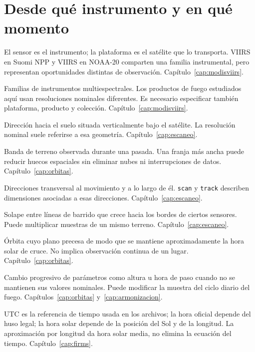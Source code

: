 \section{Desde qué instrumento y en qué momento}
\begin{description}[style=nextline,leftmargin=1.2em]
\item[Sensor y plataforma.] El sensor es el instrumento; la plataforma es el satélite
que lo transporta. VIIRS en Suomi NPP y VIIRS en NOAA-20 comparten una familia instrumental,
pero representan oportunidades distintas de observación. Capítulo~\ref{cap:modisviirs}.
\item[MODIS y VIIRS.] Familias de instrumentos multiespectrales. Los productos de fuego
estudiados aquí usan resoluciones nominales diferentes. Es necesario especificar también
plataforma, producto y colección. Capítulo~\ref{cap:modisviirs}.
\item[Nadir.] Dirección hacia el suelo situada verticalmente bajo el satélite. La
resolución nominal suele referirse a esa geometría. Capítulo~\ref{cap:escaneo}.
\item[Franja o swath.] Banda de terreno observada durante una pasada. Una franja más
ancha puede reducir huecos espaciales sin eliminar nubes ni interrupciones de datos.
Capítulo~\ref{cap:orbitas}.
\item[Barrido y traza.] Direcciones transversal al movimiento y a lo largo de él.
\texttt{scan} y \texttt{track} describen dimensiones asociadas a esas direcciones.
Capítulo~\ref{cap:escaneo}.
\item[Efecto pajarita.] Solape entre líneas de barrido que crece hacia los bordes de
ciertos sensores. Puede multiplicar muestras de un mismo terreno. Capítulo~\ref{cap:escaneo}.
\item[Órbita heliosíncrona.] Órbita cuyo plano precesa de modo que se mantiene
aproximadamente la hora solar de cruce. No implica observación continua de un lugar.
Capítulo~\ref{cap:orbitas}.
\item[Deriva orbital.] Cambio progresivo de parámetros como altura u hora de paso cuando
no se mantienen sus valores nominales. Puede modificar la muestra del ciclo diario del
fuego. Capítulos~\ref{cap:orbitas} y~\ref{cap:armonizacion}.
\item[UTC, hora oficial y hora solar.] UTC es la referencia de tiempo usada en los
archivos; la hora oficial depende del huso legal; la hora solar depende de la posición
del Sol y de la longitud. La aproximación por longitud da hora solar media, no elimina
la ecuación del tiempo. Capítulo~\ref{cap:firms}.
\end{description}

